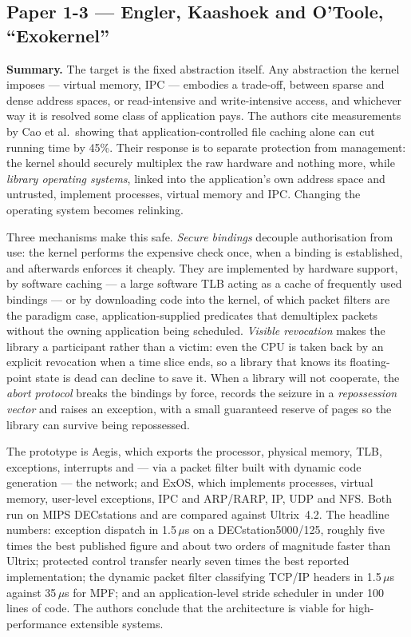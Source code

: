 \subsection*{Paper 1-3 --- Engler, Kaashoek and O'Toole, ``Exokernel''}
\label{p3:sec:exokernel}

\textbf{Summary.}
The target is the fixed abstraction itself. Any abstraction the kernel imposes --- virtual
memory, IPC --- embodies a trade-off, between sparse and dense address spaces, or
read-intensive and write-intensive access, and whichever way it is resolved some class of
application pays. The authors cite measurements by Cao et al.\ showing that
application-controlled file caching alone can cut running time by 45\%. Their response is to
separate protection from management: the kernel should securely multiplex the raw hardware
and nothing more, while \emph{library operating systems}, linked into the application's own
address space and untrusted, implement processes, virtual memory and IPC. Changing the
operating system becomes relinking.

Three mechanisms make this safe. \emph{Secure bindings} decouple authorisation from use: the
kernel performs the expensive check once, when a binding is established, and afterwards
enforces it cheaply. They are implemented by hardware support, by software caching --- a
large software TLB acting as a cache of frequently used bindings --- or by downloading code
into the kernel, of which packet filters are the paradigm case, application-supplied
predicates that demultiplex packets without the owning application being scheduled.
\emph{Visible revocation} makes the library a participant rather than a victim: even the CPU
is taken back by an explicit revocation when a time slice ends, so a library that knows its
floating-point state is dead can decline to save it. When a library will not cooperate, the
\emph{abort protocol} breaks the bindings by force, records the seizure in a
\emph{repossession vector} and raises an exception, with a small guaranteed reserve of pages
so the library can survive being repossessed.

The prototype is Aegis, which exports the processor, physical memory, TLB, exceptions,
interrupts and --- via a packet filter built with dynamic code generation --- the network;
and ExOS, which implements processes, virtual memory, user-level exceptions, IPC and
ARP/RARP, IP, UDP and NFS. Both run on MIPS DECstations and are compared against Ultrix~4.2.
The headline numbers: exception dispatch in 1.5\,$\mu$s on a DECstation5000/125, roughly five
times the best published figure and about two orders of magnitude faster than Ultrix;
protected control transfer nearly seven times the best reported implementation; the dynamic
packet filter classifying TCP/IP headers in 1.5\,$\mu$s against 35\,$\mu$s for MPF; and an
application-level stride scheduler in under 100 lines of code. The authors conclude that the
architecture is viable for high-performance extensible systems.

